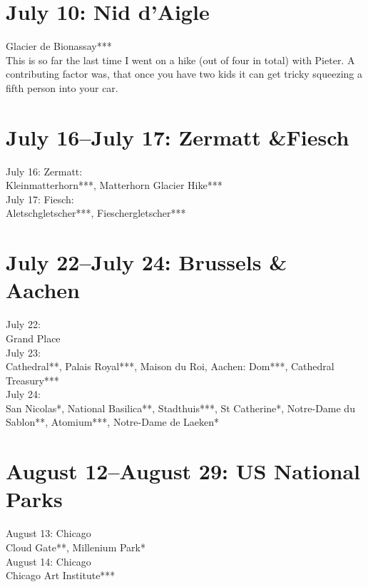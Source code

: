 \section{July 10: Nid d'Aigle}
\label{Niddaigle2016}

Glacier de Bionassay***\\

This is so far the last time I went on a hike (out of four in total) with Pieter. A contributing factor was, that once you have two kids it can get tricky squeezing a fifth person into your car.\\

\section{July 16--July 17: Zermatt \&Fiesch}
\label{ZermattFiesch2016}

July 16: Zermatt:\\
Kleinmatterhorn***, Matterhorn Glacier Hike***\\

July 17: Fiesch:\\
Aletschgletscher***, Fieschergletscher***

\section{July 22--July 24: Brussels \& Aachen}
\label{Brussels2016}

July 22:\\
Grand Place\\

July 23:\\
Cathedral**, Palais Royal***, Maison du Roi,  Aachen: Dom***, Cathedral Treasury***\\

July 24:\\
San Nicolas*, National Basilica**, Stadthuis***, St Catherine*, Notre-Dame du Sablon**,  Atomium***, Notre-Dame de Laeken*

\section{August 12--August 29: US National Parks}
\label{US2016}

August 13: Chicago\\
Cloud Gate**, Millenium Park*\\

August 14: Chicago\\
Chicago Art Institute***\\

